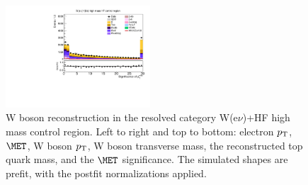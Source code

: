 \begin{figure}[tbp]
\begin{center}
    \includegraphics[width=0.48\textwidth]{figures/wlnhbb2016/resolved/WenWHHeavyFlavorCRHighMass_pfmetsig.pdf}
    \caption{W boson reconstruction in the resolved category W(e$\nu$)+HF high mass control region.
    Left to right and top to bottom: electron $p_{\mathrm{T}}$, $\MET$, W boson $p_{\mathrm{T}}$, W boson transverse mass,
    the reconstructed top quark mass, and the $\MET$ significance.
    The simulated shapes are prefit, with the postfit normalizations applied.}
    \label{fig:res_WenHFHighMass_WBosons}
  \end{center}
\end{figure}
\clearpage

